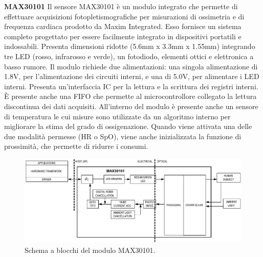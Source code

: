 \textbf{MAX30101} Il sensore MAX30101 è un modulo integrato che permette di effettuare acquisizioni fotopletismografiche per misurazioni di ossimetria e di frequenza cardiaca prodotto da Maxim Integrated\cite{IntegratedMAX30101}. Esso fornisce un sistema completo progettato per essere facilmente integrato in dispositivi portatili e indossabili. Presenta dimensioni ridotte (5.6mm x 3.3mm x 1.55mm) integrando tre LED (rosso, infrarosso e verde), un fotodiodo, elementi ottici e elettronica a basso rumore. Il modulo richiede due alimentazioni: una singola alimentazione di 1.8V, per l'alimentazione dei circuiti interni, e una di 5.0V, per alimentare i LED interni. Presenta un'interfaccia IC per la lettura e la scrittura dei registri interni. \`E presente anche una FIFO che permette al microcontrollore collegato la lettura discontinua dei dati acquisiti. All'interno del modulo è presente anche un sensore di temperatura le cui misure sono utilizzate da un algoritmo interno per migliorare la stima del grado di ossigenazione. Quando viene attivata una delle due modalità permesse (HR o SpO), viene anche inizializzata la funzione di prossimità, che permette di ridurre i consumi.   
\begin{figure}[h]
	\centering
	\includegraphics[width=0.9\linewidth]{ImageFiles/Fotopletismografia/MAX30101BlockDiagram}
	\caption{Schema a blocchi del modulo MAX30101.}
	\label{fig:MAX30101BlockDiagram}
\end{figure}

